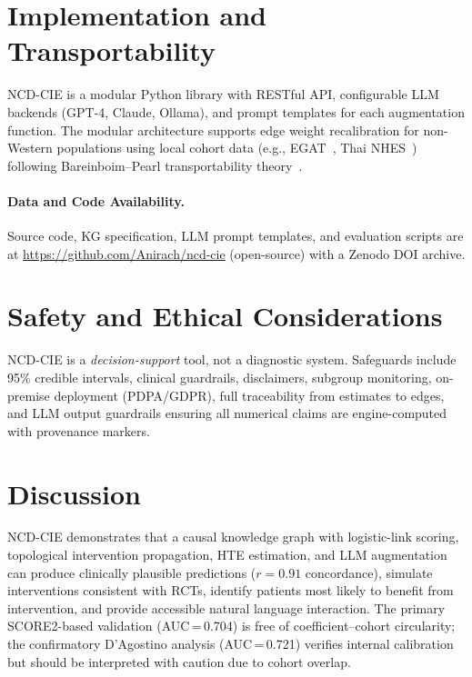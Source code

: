 \documentclass[runningheads]{llncs}
\begin{document}
\section{Implementation and Transportability}\label{sec:impl}

NCD-CIE is a modular Python library with RESTful API, configurable
LLM backends (GPT-4, Claude, Ollama), and prompt templates for each
augmentation function.
The modular architecture supports edge weight recalibration for
non-Western populations using local cohort data (e.g.,
EGAT~\cite{sritara2003egat}, Thai NHES~\cite{aekplakorn2011thai})
following Bareinboim--Pearl transportability
theory~\cite{bareinboim2016causal}.

\paragraph{Data and Code Availability.}
Source code, KG specification, LLM prompt templates, and evaluation
scripts are at
\url{https://github.com/Anirach/ncd-cie} (open-source) with a
Zenodo DOI archive.

\section{Safety and Ethical Considerations}\label{sec:ethics}

NCD-CIE is a \emph{decision-support} tool, not a diagnostic system.
Safeguards include 95\% credible intervals, clinical guardrails,
disclaimers, subgroup monitoring, on-premise deployment
(PDPA/GDPR), full traceability from estimates to edges, and
LLM output guardrails ensuring all numerical claims are
engine-computed with provenance markers.

\section{Discussion}\label{sec:discussion}

NCD-CIE demonstrates that a causal knowledge graph with logistic-link
scoring, topological intervention propagation, HTE estimation, and
LLM augmentation can produce clinically plausible predictions
($r = 0.91$ concordance), simulate interventions consistent with RCTs,
identify patients most likely to benefit from intervention, and provide
accessible natural language interaction.
The primary SCORE2-based validation (AUC\,=\,0.704) is free of
coefficient--cohort circularity; the confirmatory D'Agostino analysis
(AUC\,=\,0.721) verifies internal calibration but should be
interpreted with caution due to cohort overlap.
\end{document}
